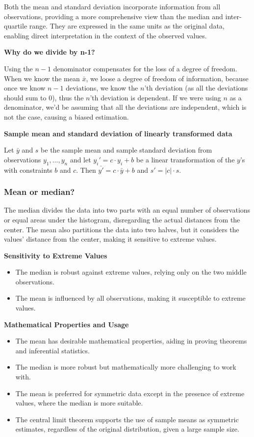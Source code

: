 \documentclass{article}
\begin{document}
Both the mean and standard deviation incorporate information from all observations, providing a more comprehensive view than the median and inter-quartile range. They are expressed in the same units as the original data, enabling direct interpretation in the context of the observed values.

\textbf{Why do we divide by n-1?}

Using the $n-1$ denominator compensates for the loss of a degree of freedom. When we know the mean $\bar x$, we loose a degree of freedom of information, because once we know $n-1$ deviations, we know the $n$'th deviation (as all the deviations should sum to 0), thus the $n$'th deviation is dependent. If we were using $n$ as a denominator, we'd be assuming that all the deviations are independent, which is not the case, causing a biased estimation.

\pagebreak

\textbf{Sample mean and standard deviation of linearly transformed data}

Let $\bar{y}$ and $s$ be the sample mean and sample standard deviation from observations $y_1,...,y_n$ and let $y_{i}'=c \cdot y_{i} + b$ be a linear transformation of the $y$'s with constraints $b$ and $c$. Then $\bar{y'} = c \cdot \bar{y}+b$ and $s'=|c|\cdot s$.

\subsubsection{Mean or median?}
The median divides the data into two parts with an equal number of observations or equal areas under the histogram, disregarding the actual distances from the center. The mean also partitions the data into two halves, but it considers the values' distance from the center, making it sensitive to extreme values. 

\textbf{Sensitivity to Extreme Values}
\begin{itemize}
    \item The median is robust against extreme values, relying only on the two middle observations.
    \item The mean is influenced by all observations, making it susceptible to extreme values.
\end{itemize} 

\textbf{Mathematical Properties and Usage}
\begin{itemize}
    \item The mean has desirable mathematical properties, aiding in proving theorems and inferential statistics.
    \item The median is more robust but mathematically more challenging to work with.
    \item The mean is preferred for symmetric data except in the presence of extreme values, where the median is more suitable.
    \item The central limit theorem supports the use of sample means as symmetric estimates, regardless of the original distribution, given a large sample size.
\end{itemize}
\end{document}
